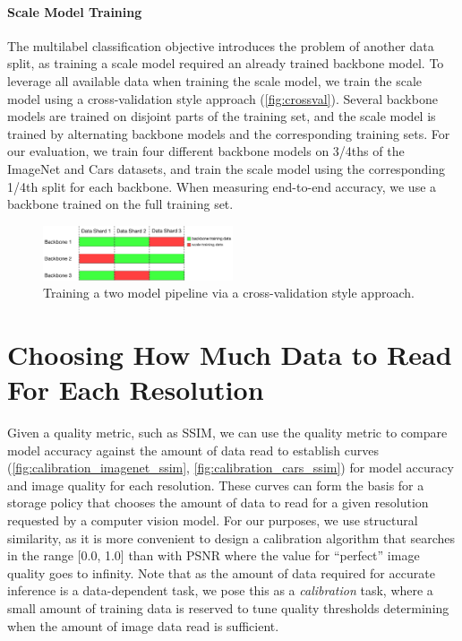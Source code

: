 \paragraph{Scale Model Training}
The multilabel classification objective introduces the problem of another data split, as training a scale model required an already trained backbone model.
To leverage all available data when training the scale model, we train the scale model using a cross-validation style approach (\autoref{fig:crossval}).
Several backbone models are trained on disjoint parts of the training set, and the scale model is trained by alternating backbone models and the corresponding training sets.
For our evaluation, we train four different backbone models on 3/4ths of the ImageNet and Cars datasets, and train the scale model using the corresponding 1/4th split for each backbone.
When measuring end-to-end accuracy, we use a backbone trained on the full training set.

\begin{figure}
    \centering
    \includegraphics[width=0.5\textwidth]{e2e_diagrams/cross val.pdf}
    \caption{Training a two model pipeline via a cross-validation style approach.
    }
    \label{fig:crossval}
\end{figure}


\section{Choosing How Much Data to Read For Each Resolution}
Given a quality metric, such as SSIM, we can use the quality metric to compare model accuracy against the amount of data read to establish curves
(\autoref{fig:calibration_imagenet_ssim}, \autoref{fig:calibration_cars_ssim}) for model accuracy and image quality for each resolution.
These curves can form the basis for a storage policy that chooses the amount of data to read for a given resolution requested by a computer vision model.
For our purposes, we use structural similarity, as it is more convenient to design a calibration algorithm that searches in the range [0.0, 1.0] than with PSNR where the value for ``perfect'' image quality goes to infinity.
Note that as the amount of data required for accurate inference is a data-dependent task, we pose this as a \emph{calibration} task, where a small amount of training data is reserved to tune quality thresholds determining when the amount of image data read is sufficient.

